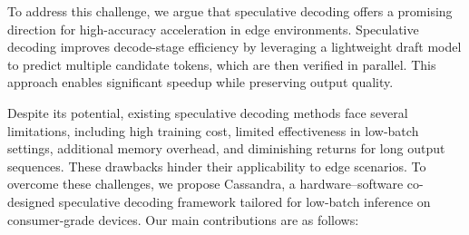

To address this challenge, we argue that speculative decoding offers a promising direction for high-accuracy acceleration in edge environments. Speculative decoding improves decode-stage efficiency by leveraging a lightweight draft model to predict multiple candidate tokens, which are then verified in parallel. This approach enables significant speedup while preserving output quality.

Despite its potential, existing speculative decoding methods face several limitations, including high training cost, limited effectiveness in low-batch settings, additional memory overhead, and diminishing returns for long output sequences. These drawbacks hinder their applicability to edge scenarios. To overcome these challenges, we propose Cassandra, a hardware–software co-designed speculative decoding framework tailored for low-batch inference on consumer-grade devices. Our main contributions are as follows:


